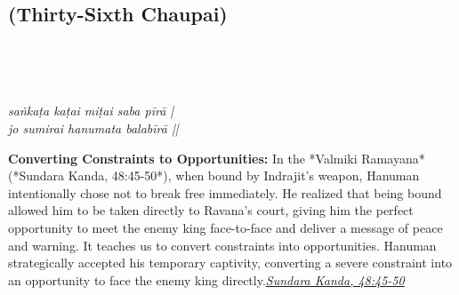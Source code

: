 
\newpage

\subsection*{ (Thirty-Sixth Chaupai)}

\begin{minipage}[t]{0.55\textwidth}
\vspace{0pt}

{\large \linespread{1.5}\selectfont
{}\\
\par}

\vspace{0.5em}

{\large \linespread{1.5}\selectfont
{}\\
\par}

\vspace{0.5em}

{\large \linespread{1.3}\selectfont
\textit{saṅkaṭa kaṭai miṭai saba pīrā |}\\
\textit{jo sumirai hanumata balabīrā ||}
\par}
\end{minipage}%
\hfill
\begin{minipage}[t]{0.42\textwidth}
\vspace{0pt}
\begin{tcolorbox}[anchorbox]
\textbf{Converting Constraints to Opportunities:} In the *Valmiki Ramayana* (*Sundara Kanda, 48:45-50*), when bound by Indrajit's weapon, Hanuman intentionally chose not to break free immediately. He realized that being bound allowed him to be taken directly to Ravana's court, giving him the perfect opportunity to meet the enemy king face-to-face and deliver a message of peace and warning. It teaches us to convert constraints into opportunities.
\vspace{0.5em}\newline Hanuman strategically accepted his temporary captivity, converting a severe constraint into an opportunity to face the enemy king directly.\newline\null\hfill\href{https://www.valmiki.iitk.ac.in/sloka?field_kanda_tid=5&language=dv&field_sarga_value=48}{\textit{Sundara Kanda, 48:45-50}}
\end{tcolorbox}
\end{minipage}

